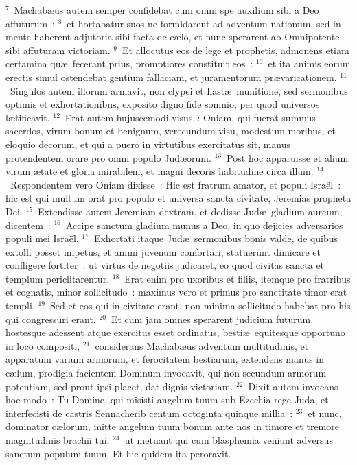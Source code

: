 ${}^{7}$~Machab\ae us autem semper confidebat cum omni spe auxilium sibi a Deo affuturum~:
${}^{8}$~et hortabatur suos ne formidarent ad adventum nationum, sed in mente haberent adjutoria sibi facta de c\ae lo, et nunc sperarent ab Omnipotente sibi affuturam victoriam.
${}^{9}$~Et allocutus eos de lege et prophetis, admonens etiam certamina qu\ae\ fecerant prius, promptiores constituit eos~:
${}^{10}$~et ita animis eorum erectis simul ostendebat gentium fallaciam, et juramentorum pr\ae varicationem.
${}^{11}$~Singulos autem illorum armavit, non clypei et hast\ae\ munitione, sed sermonibus optimis et exhortationibus, exposito digno fide somnio, per quod universos l\ae tificavit.
${}^{12}$~Erat autem hujuscemodi visus~: Oniam, qui fuerat summus sacerdos, virum bonum et benignum, verecundum visu, modestum moribus, et eloquio decorum, et qui a puero in virtutibus exercitatus sit, manus protendentem orare pro omni populo Jud\ae orum.
${}^{13}$~Post hoc apparuisse et alium virum \ae tate et gloria mirabilem, et magni decoris habitudine circa illum.
${}^{14}$~Respondentem vero Oniam dixisse~: Hic est fratrum amator, et populi Isra\"el~: hic est qui multum orat pro populo et universa sancta civitate, Jeremias propheta Dei.
${}^{15}$~Extendisse autem Jeremiam dextram, et dedisse Jud\ae\ gladium aureum, dicentem~:
${}^{16}$~Accipe sanctum gladium munus a Deo, in quo dejicies adversarios populi mei Isra\"el.
${}^{17}$~Exhortati itaque Jud\ae\ sermonibus bonis valde, de quibus extolli posset impetus, et animi juvenum confortari, statuerunt dimicare et confligere fortiter~: ut virtus de negotiis judicaret, eo quod civitas sancta et templum periclitarentur.
${}^{18}$~Erat enim pro uxoribus et filiis, itemque pro fratribus et cognatis, minor sollicitudo~: maximus vero et primus pro sanctitate timor erat templi.
${}^{19}$~Sed et eos qui in civitate erant, non minima sollicitudo habebat pro his qui congressuri erant.
${}^{20}$~Et cum jam omnes sperarent judicium futurum, hostesque adessent atque exercitus esset ordinatus, besti\ae\ equitesque opportuno in loco compositi,
${}^{21}$~considerans Machab\ae us adventum multitudinis, et apparatum varium armorum, et ferocitatem bestiarum, extendens manus in c\ae lum, prodigia facientem Dominum invocavit, qui non secundum armorum potentiam, sed prout ipsi placet, dat dignis victoriam.
${}^{22}$~Dixit autem invocans hoc modo~: Tu Domine, qui misisti angelum tuum sub Ezechia rege Juda, et interfecisti de castris Sennacherib centum octoginta quinque millia~:
${}^{23}$~et nunc, dominator c\ae lorum, mitte angelum tuum bonum ante nos in timore et tremore magnitudinis brachii tui,
${}^{24}$~ut metuant qui cum blasphemia veniunt adversus sanctum populum tuum. Et hic quidem ita peroravit.


